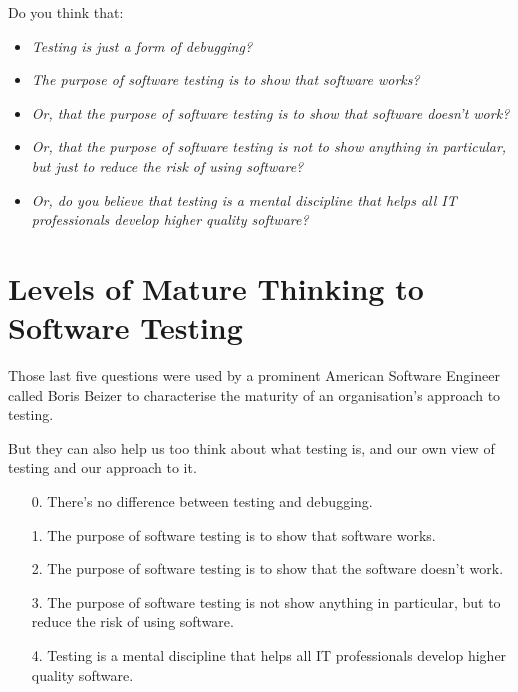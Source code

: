 Do you think that:

\begin{itemize}
    \item {\it Testing is just a form of debugging?}

    \item {\it The purpose of software testing is to show that software works?}

    \item {\it Or, that the purpose of software testing is to show that software doesn't work?}

    \item {\it Or, that the purpose of software testing is not to show anything
    in particular, but just to reduce the risk of using software?}

    \item {\it Or, do you believe that testing is a mental discipline that helps
    all IT professionals develop higher quality software?}
\end{itemize}



\section{Levels of Mature Thinking to Software Testing}


Those last five questions were used by a prominent American Software Engineer
called Boris Beizer to characterise the maturity of an organisation's approach
to testing.

But they can also help us too think about what testing is, and our own view of
testing and our approach to it.


\begin{itemize}
    \item[0.] There's no difference between testing and debugging.

    \item[1.] The purpose of software testing is to show that software works.

    \item[2.] The purpose of software testing is to show that the software
    doesn't work.

    \item[3.] The purpose of software testing is not show anything in
    particular, but to reduce the risk of using software.

    \item[4.] Testing is a mental discipline that helps all IT professionals
    develop higher quality software.
\end{itemize}

